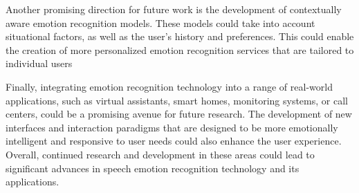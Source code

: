 Another promising direction for future work is the development of contextually aware emotion recognition models. These models could take into account situational factors, as well as the user's history and preferences. This could enable the creation of more personalized emotion recognition services that are tailored to individual users

Finally, integrating emotion recognition technology into a range of real-world applications, such as virtual assistants, smart homes, monitoring systems, or call centers, could be a promising avenue for future research. The development of new interfaces and interaction paradigms that are designed to be more emotionally intelligent and responsive to user needs could also enhance the user experience. Overall, continued research and development in these areas could lead to significant advances in speech emotion recognition technology and its applications.